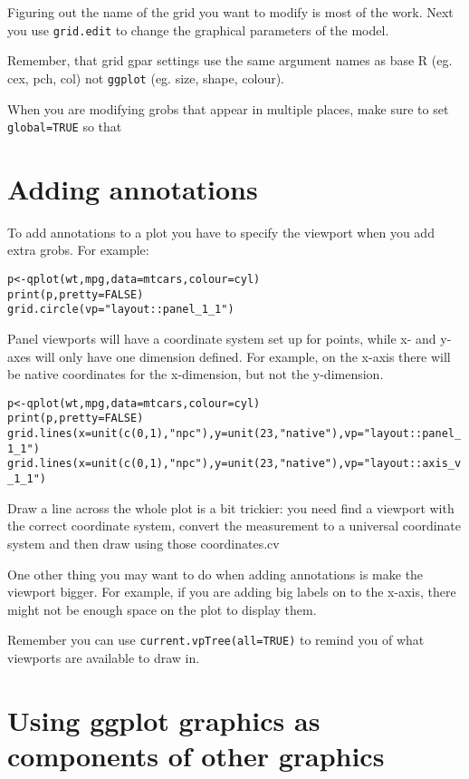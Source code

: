 Figuring out the name of the grid you want to modify is most of the work.  Next you use {\tt grid.edit} to change the graphical parameters of the model.

Remember, that grid gpar settings use the same argument names as base R (eg. cex, pch, col) not {\tt ggplot} (eg. size, shape, colour).

When you are modifying grobs that appear in multiple places, make sure to set {\tt global=TRUE} so that 

\section{Adding annotations}\label{sec:adding_annotations}

To add annotations to a plot you have to specify the viewport when you add extra grobs.  For example:

\begin{alltt}
p <- qplot(wt, mpg, data=mtcars, colour=cyl)
print(p, pretty=FALSE)
grid.circle(vp="layout::panel_1_1")
\end{alltt}

Panel viewports will have a coordinate system set up for points, while x- and y- axes will only have one dimension defined.  For example, on the x-axis there will be native coordinates for the x-dimension, but not the y-dimension.

\begin{alltt}
p <- qplot(wt, mpg, data=mtcars, colour=cyl)
print(p, pretty=FALSE)
grid.lines(x=unit(c(0,1), "npc"), y=unit(23, "native"), vp="layout::panel_1_1")
grid.lines(x=unit(c(0,1), "npc"), y=unit(23, "native"), vp="layout::axis_v_1_1")
\end{alltt}

Draw a line across the whole plot is a bit trickier: you need find a viewport with the correct coordinate system, convert the measurement to a universal coordinate system and then draw using those coordinates.cv


One other thing you may want to do when adding annotations is make the viewport bigger.  For example, if you are adding big labels on to the x-axis, there might not be enough space on the plot to display them.  

Remember you can use {\tt current.vpTree(all=TRUE)} to remind you of what viewports are available to draw in.

\section{Using ggplot graphics as components of other graphics }\label{sec:using_}



